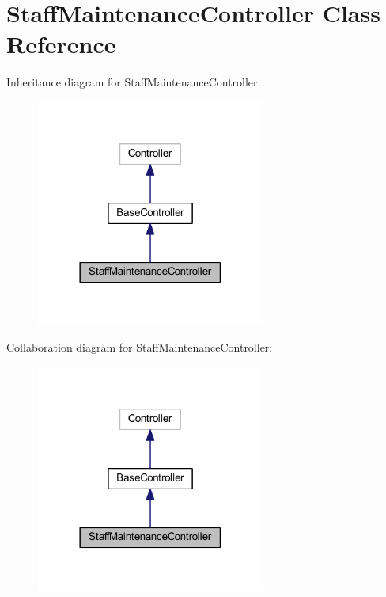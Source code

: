 \hypertarget{class_staff_maintenance_controller}{}\section{Staff\+Maintenance\+Controller Class Reference}
\label{class_staff_maintenance_controller}


Inheritance diagram for Staff\+Maintenance\+Controller\+:
\nopagebreak
\begin{figure}[H]
\begin{center}
\leavevmode
\includegraphics[width=213pt]{class_staff_maintenance_controller__inherit__graph}
\end{center}
\end{figure}


Collaboration diagram for Staff\+Maintenance\+Controller\+:
\nopagebreak
\begin{figure}[H]
\begin{center}
\leavevmode
\includegraphics[width=213pt]{class_staff_maintenance_controller__coll__graph}
\end{center}
\end{figure}
